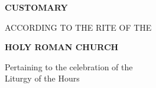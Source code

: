 


	\begin{titlepage}
		\vspace*{\fill}
		
		\begin{center}
			
			\textbf{\Huge\color{red} CUSTOMARY}
			
			ACCORDING TO THE RITE OF THE
			
			\textbf{\LARGE HOLY ROMAN CHURCH}
			
			\vspace*{\fill}
			
			Pertaining to the celebration of the\\Liturgy of the Hours
			
		\end{center}
		
		\vspace*{\fill}
	\end{titlepage}
	
	
	
	\raggedbottom
	
	
	
	
	
